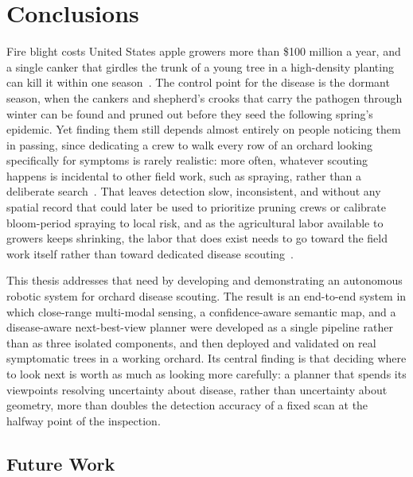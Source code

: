 
\chapter{Conclusions} \label{chapConclusions}

Fire blight costs United States apple growers more than \$100 million a
year, and a single canker that girdles the trunk of a young tree in a
high-density planting can kill it within one
season~\cite{Norelli2003FireBlightManagementTwentyFirst,
Acimovic2023RootstockFireBlight, acimovic2026fireblight}.
The control point for the disease is the dormant season, when the cankers
and shepherd's crooks that carry the pathogen through winter can be found
and pruned out before they seed the following spring's epidemic.
Yet finding them still depends almost entirely on people noticing them
in passing, since dedicating a crew to walk every row of an orchard
looking specifically for symptoms is rarely realistic: more often,
whatever scouting happens is incidental to other field work, such as
spraying, rather than a deliberate search~\cite{Peter2023PennStateExtension}.
That leaves detection slow, inconsistent, and without any spatial
record that could later be used to prioritize pruning crews or
calibrate bloom-period spraying to local risk, and as the agricultural
labor available to growers keeps shrinking, the labor that does exist
needs to go toward the field work itself rather than toward dedicated
disease scouting~\cite{gerlach2025usapple}.

This thesis addresses that need by developing and demonstrating an
autonomous robotic system for orchard disease scouting.
The result is an end-to-end system in which close-range multi-modal
sensing, a confidence-aware semantic map, and a disease-aware
next-best-view planner were developed as a single pipeline rather than as
three isolated components, and then deployed and validated on real
symptomatic trees in a working orchard.
Its central finding is that deciding where to look next is worth as much
as looking more carefully: a planner that spends its viewpoints resolving
uncertainty about disease, rather than uncertainty about geometry, more
than doubles the detection accuracy of a fixed scan at the halfway
point of the inspection.

\section{Future Work} \label{secFutureWork}

